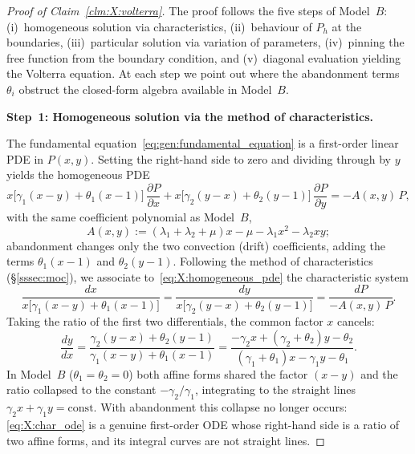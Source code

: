 \begin{proof}[Proof of Claim~\ref{clm:X:volterra}]
The proof follows the five steps of Model~$B$: (i)~homogeneous solution via
characteristics, (ii)~behaviour of $P_h$ at the boundaries, (iii)~particular solution
via variation of parameters, (iv)~pinning the free function from the boundary condition,
and (v)~diagonal evaluation yielding the Volterra equation. At each step we point out
where the abandonment terms $\theta_i$ obstruct the closed-form algebra available in
Model~$B$.

\medskip\noindent\textbf{Step~1: Homogeneous solution via the method of characteristics.}

The fundamental equation~\eqref{eq:gen:fundamental_equation} is a first-order linear PDE
in $P(x,y)$. Setting the right-hand side to zero and dividing through by $y$ yields the
homogeneous PDE
\begin{equation}
    x\bigl[\gamma_1(x-y)+\theta_1(x-1)\bigr]\,\frac{\partial P}{\partial x}
    + x\bigl[\gamma_2(y-x)+\theta_2(y-1)\bigr]\,\frac{\partial P}{\partial y}
    = -A(x,y)\,P,
    \label{eq:X:homogeneous_pde}
\end{equation}
with the same coefficient polynomial as Model~$B$,
\begin{equation}
    A(x,y) := (\lambda_1+\lambda_2+\mu)x - \mu - \lambda_1 x^2 - \lambda_2 xy ;
    \label{eq:X:Adef}
\end{equation}
abandonment changes only the two convection (drift) coefficients, adding the terms
$\theta_1(x-1)$ and $\theta_2(y-1)$. Following the method of characteristics
(\S\ref{sssec:moc}), we associate to~\eqref{eq:X:homogeneous_pde} the characteristic
system
\begin{equation}
    \frac{dx}{x\bigl[\gamma_1(x-y)+\theta_1(x-1)\bigr]}
    = \frac{dy}{x\bigl[\gamma_2(y-x)+\theta_2(y-1)\bigr]}
    = \frac{dP}{-A(x,y)\,P}.
    \label{eq:X:char_system}
\end{equation}
Taking the ratio of the first two differentials, the common factor $x$ cancels:
\begin{equation}
    \frac{dy}{dx}
    = \frac{\gamma_2(y-x)+\theta_2(y-1)}{\gamma_1(x-y)+\theta_1(x-1)}
    = \frac{-\gamma_2 x + (\gamma_2+\theta_2)y - \theta_2}
           {(\gamma_1+\theta_1)x - \gamma_1 y - \theta_1}.
    \label{eq:X:char_ode}
\end{equation}
In Model~$B$ ($\theta_1=\theta_2=0$) both affine forms shared the factor $(x-y)$ and the
ratio collapsed to the constant $-\gamma_2/\gamma_1$, integrating to the straight lines
$\gamma_2 x+\gamma_1 y=\mathrm{const}$. With abandonment this collapse no longer occurs:
\eqref{eq:X:char_ode} is a genuine first-order ODE whose right-hand side is a ratio of
two affine forms, and its integral curves are not straight lines.


\end{proof}
